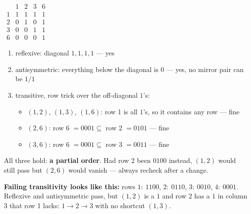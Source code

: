 \documentclass{fkt-notes}
\theoremstyle{definition}
\begin{document}
\begin{example}
  \leavevmode\par\noindent
  \begin{minipage}[c]{0.28\textwidth}
    \centering
    $\begin{array}{c|cccc}
          & 1 & 2 & 3 & 6 \\ \hline
        1 & 1 & 1 & 1 & 1 \\
        2 & 0 & 1 & 0 & 1 \\
        3 & 0 & 0 & 1 & 1 \\
        6 & 0 & 0 & 0 & 1
      \end{array}$
  \end{minipage}\hfill
  \begin{minipage}[c]{0.7\textwidth}
    \begin{enumerate}[nosep]
      \item reflexive: diagonal $1,1,1,1$ --- yes
      \item antisymmetric: everything below the diagonal is $0$ ---
            yes, no mirror pair can be $1/1$
      \item transitive, row trick over the off-diagonal $1$'s:
            \begin{itemize}[nosep]
              \item $(1,2)$, $(1,3)$, $(1,6)$: row 1 is all $1$'s,
                    so it contains any row --- fine
              \item $(2,6)$: row 6 $= 0001 \subseteq$ row 2 $= 0101$ --- fine
              \item $(3,6)$: row 6 $= 0001 \subseteq$ row 3 $= 0011$ --- fine
            \end{itemize}
    \end{enumerate}
    All three hold: \textbf{a partial order}. Had row 2 been $0100$
    instead, $(1,2)$ would still pass but $(2,6)$ would vanish ---
    always recheck after a change.
  \end{minipage}
\end{example}

\noindent\textbf{Failing transitivity looks like this:} rows $1{:}\ 1100$,
$2{:}\ 0110$, $3{:}\ 0010$, $4{:}\ 0001$. Reflexive and antisymmetric
pass, but $(1,2)$ is a $1$ and row 2 has a $1$ in column 3 that row 1
lacks: $1 \to 2 \to 3$ with no shortcut $(1,3)$.
\end{document}
